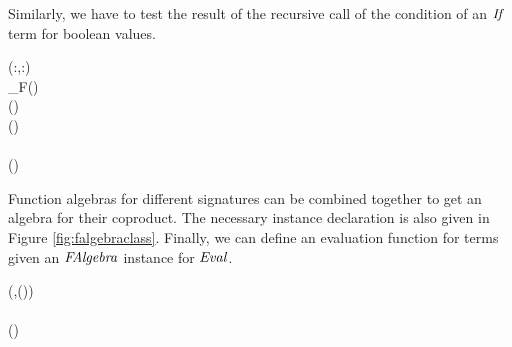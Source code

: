 Similarly, we have to test the result of the recursive call of the
condition of an \ensuremath{\Conid{If}} term for boolean values.
\begin{hscode}\SaveRestoreHook
{}%
%
%
%
%
%
%
%
%
%
%
\>[3]{}\;{}\<[13]%
\>[13]{}(\prec:,\prec:)\Rightarrow {}\<[E]%
\\
\>[13]{}\<[15]%
\>[15]{}\;\;_F\;(\;)\;\<[E]%
\\
\>[3]{}\<[5]%
\>[5]{}\;\;(\;){}\<[32]%
\>[32]{}\mathrel{=}{}\<[32E]%
\>[35]{}\;\<[E]%
\\
\>[3]{}\<[5]%
\>[5]{}\;\;(\;\;\;){}\<[32]%
\>[32]{}\mathrel{=}{}\<[32E]%
\\
\>[5]{}\<[7]%
\>[7]{}\;\;\;\<[E]%
\\
\>[7]{}\<[9]%
\>[9]{}\;(\;)\to {}\;\;\;\;\;\<[E]%
\ColumnHook
\end{hscode}\resethooks
Function algebras for different signatures can be combined together to
get an algebra for their coproduct. The necessary instance declaration
is also given in Figure \ref{fig:falgebraclass}. Finally, we can
define an evaluation function for terms given an \ensuremath{\Conid{FAlgebra}} instance
for \ensuremath{\Conid{Eval}}.
\begin{hscode}\SaveRestoreHook
{}%
%
%
%
%
\>[3]{}\llbracket \cdot \rrbracket\mathbin{::}{}\<[12]%
\>[12]{}(\;,\;\;\;(\;))\Rightarrow {}\<[E]%
\\
\>[12]{}\<[14]%
\>[14]{}\;\to {}\;\<[E]%
\\
\>[3]{}\llbracket \cdot \rrbracket\mathrel{=}\;(\;){}\<[E]%
\ColumnHook
\end{hscode}\resethooks

